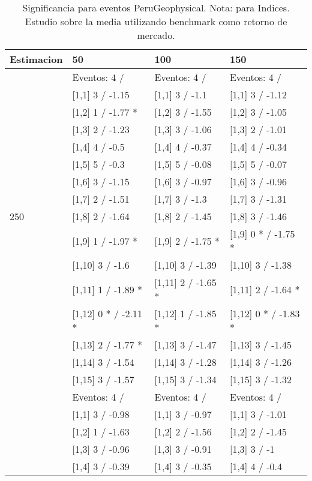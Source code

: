 \begin{table}

\caption{Significancia para eventos PeruGeophysical. Nota: para Indices. Estudio sobre la media utilizando benchmark como retorno de mercado.}
\centering
\begin{tabular}[t]{llll}
\toprule
Estimacion & 50 & 100 & 150\\
\midrule
 & Eventos:  4 / & Eventos:  4 / & Eventos:  4 /\\
 & {}[1,1] 3  / -1.15 & {}[1,1] 3  / -1.1 & {}[1,1] 3  / -1.12\\
 & {}[1,2] 1  / -1.77 * & {}[1,2] 3  / -1.55 & {}[1,2] 3  / -1.05\\
 & {}[1,3] 2  / -1.23 & {}[1,3] 3  / -1.06 & {}[1,3] 2  / -1.01\\
 & {}[1,4] 4  / -0.5 & {}[1,4] 4  / -0.37 & {}[1,4] 4  / -0.34\\
\addlinespace
 & {}[1,5] 5  / -0.3 & {}[1,5] 5  / -0.08 & {}[1,5] 5  / -0.07\\
 & {}[1,6] 3  / -1.15 & {}[1,6] 3  / -0.97 & {}[1,6] 3  / -0.96\\
 & {}[1,7] 2  / -1.51 & {}[1,7] 3  / -1.3 & {}[1,7] 3  / -1.31\\
250 & {}[1,8] 2  / -1.64 & {}[1,8] 2  / -1.45 & {}[1,8] 3  / -1.46\\
 & {}[1,9] 1  / -1.97 * & {}[1,9] 2  / -1.75 * & {}[1,9] 0 * / -1.75 *\\
\addlinespace
 & {}[1,10] 3  / -1.6 & {}[1,10] 3  / -1.39 & {}[1,10] 3  / -1.38\\
 & {}[1,11] 1  / -1.89 * & {}[1,11] 2  / -1.65 * & {}[1,11] 2  / -1.64 *\\
 & {}[1,12] 0 * / -2.11 * & {}[1,12] 1  / -1.85 * & {}[1,12] 0 * / -1.83 *\\
 & {}[1,13] 2  / -1.77 * & {}[1,13] 3  / -1.47 & {}[1,13] 3  / -1.45\\
 & {}[1,14] 3  / -1.54 & {}[1,14] 3  / -1.28 & {}[1,14] 3  / -1.26\\
\addlinespace
 & {}[1,15] 3  / -1.57 & {}[1,15] 3  / -1.34 & {}[1,15] 3  / -1.32\\
 & Eventos:  4 / & Eventos:  4 / & Eventos:  4 /\\
 & {}[1,1] 3  / -0.98 & {}[1,1] 3  / -0.97 & {}[1,1] 3  / -1.01\\
 & {}[1,2] 1  / -1.63 & {}[1,2] 2  / -1.56 & {}[1,2] 2  / -1.45\\
 & {}[1,3] 3  / -0.96 & {}[1,3] 3  / -0.91 & {}[1,3] 3  / -1\\
\addlinespace
 & {}[1,4] 3  / -0.39 & {}[1,4] 3  / -0.35 & {}[1,4] 4  / -0.4\\

\end{tabular}
\end{table}
